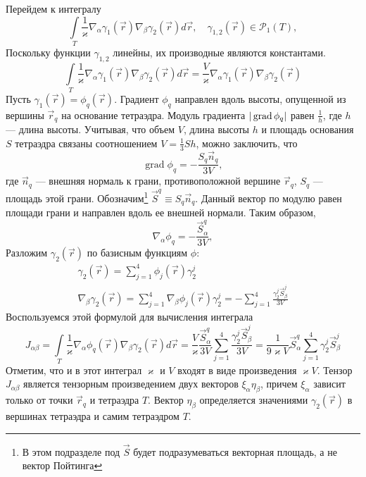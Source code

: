 Перейдем к интегралу
\begin{equation}
\int\limits_T \frac{1}{\varkappa} \nabla_\alpha\gamma_1(\vec r)\nabla_\beta\gamma_2(\vec r) d \vec r, \quad \gamma_{1,2}(\vec r) \in \mathcal{P}_1(T),
\label{eq:vol2}
\end{equation}
Поскольку функции $\gamma_{1,2}$ линейны, их производные являются константами.
\begin{equation}
\int\limits_T \frac{1}{\varkappa} \nabla_\alpha\gamma_1(\vec r)\nabla_\beta\gamma_2(\vec r) d \vec r = 
\frac{V}{\varkappa} \nabla_\alpha\gamma_1(\vec r)\nabla_\beta\gamma_2(\vec r)
\label{eq:quad2}
\end{equation}
Пусть $\gamma_1(\vec r) = \phi_q(\vec r)$. Градиент $\phi_q$ направлен вдоль высоты, опущенной из вершины $\vec r_q$ на основание тетраэдра.
Модуль градиента $|\operatorname{grad} \phi_q|$ равен $\frac{1}{h}$, где $h$ --- длина высоты. Учитывая, что объем $V$, длина высоты $h$ и площадь
основания $S$ тетраэдра связаны соотношением $V = \frac{1}{3}S h$, можно заключить, что
\begin{equation}
\operatorname{grad} \phi_q = -\frac{S_q\vec n_q}{3V},
\label{eq:grad}
\end{equation}
где $\vec n_q$ --- внешняя нормаль к грани, противоположной вершине $\vec r_q$, $S_q$ --- площадь этой грани. 
Обозначим\footnote{В этом подразделе под $\vec S$ будет подразумеваться векторная площадь, а не вектор Пойтинга} 
$\vec S^q \equiv S_q \vec n_q$. Данный вектор по модулю равен площади грани и направлен вдоль ее внешней нормали. Таким образом,
\begin{equation}
\nabla_\alpha \phi_q = -\frac{\vec S^q_\alpha}{3V},
\label{eq:nabla}
\end{equation}
Разложим $\gamma_2(\vec r)$ по базисным функциям $\phi$:
\begin{align}
\gamma_2(\vec r) = \sum_{j=1}^4 \phi_j(\vec r) \gamma_2^j\\
\nabla_\beta\gamma_2(\vec r) = \sum_{j=1}^4 \nabla_\beta\phi_j(\vec r) \gamma_2^j = - \sum_{j=1}^4 \frac{\gamma_2^j\vec S^j_\beta}{3V}
\label{eq:nabla2}
\end{align}
Воспользуемся этой формулой для вычисления интеграла
\begin{equation}
J_{\alpha\beta} = \int\limits_T \frac{1}{\varkappa} \nabla_\alpha \phi_q(\vec r) \nabla_\beta \gamma_2(\vec r) d\vec r = 
\frac{V}{\varkappa} \frac{\vec S^q_\alpha}{3V}\sum_{j=1}^4 \frac{\gamma_2^j\vec S^j_\beta}{3V} = 
\frac{1}{9\varkappa V} \vec S_\alpha^q\sum_{j=1}^4 \gamma_2^j\vec S_\beta^j
\label{eq:int2}
\end{equation}
Отметим, что и в этот интеграл $\varkappa$ и $V$ входят в виде произведения $\varkappa V$. Тензор $J_{\alpha\beta}$ 
является тензорным произведением двух векторов $\xi_\alpha \eta_\beta$, причем $\xi_\alpha$ зависит только от точки $\vec r_q$ и 
тетраэдра $T$. Вектор $\eta_\beta$ определяется значениями $\gamma_2(\vec r)$ в вершинах тетраэдра и самим тетраэдром $T$.

